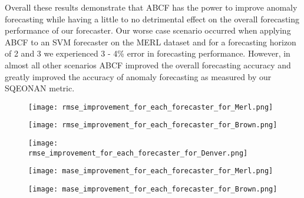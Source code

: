 Overall these results demonstrate that ABCF has the power to improve anomaly forecasting while having a little to no detrimental effect on the overall forecasting performance of our forecaster.  Our worse case scenario occurred when applying ABCF to an SVM forecaster on the MERL dataset and for a forecasting horizon of 2 and 3 we experienced 3 - 4\% error in forecasting performance.  However, in almost all other scenarios ABCF improved the overall forecasting accuracy and greatly improved the accuracy of anomaly forecasting as measured by our SQEONAN metric.

  
\begin{figure}[!h]
	\begin{center}
		\texttt{[image: rmse\_improvement\_for\_each\_forecaster\_for\_Merl.png]}
	\end{center}
	\caption{}
	\label{fig:rmse_improve_merl}
\end{figure}

\begin{figure}[!h]
	\begin{center}
		\texttt{[image: rmse\_improvement\_for\_each\_forecaster\_for\_Brown.png]}
	\end{center}
	\caption{}
	\label{fig:rmse_improve_brown}
\end{figure}

\begin{figure}[!h]
	\begin{center}
		\texttt{[image: rmse\_improvement\_for\_each\_forecaster\_for\_Denver.png]}
	\end{center}
	\caption{}
	\label{fig:rmse_improve_denver}
\end{figure}

\begin{figure}[!h]
	\begin{center}
		\texttt{[image: mase\_improvement\_for\_each\_forecaster\_for\_Merl.png]}
	\end{center}
	\caption{}
	\label{fig:mase_improve_merl}
\end{figure}

\begin{figure}[!h]
	\begin{center}
		\texttt{[image: mase\_improvement\_for\_each\_forecaster\_for\_Brown.png]}
	\end{center}
	\caption{}
	\label{fig:mase_improve_brown}
\end{figure}


